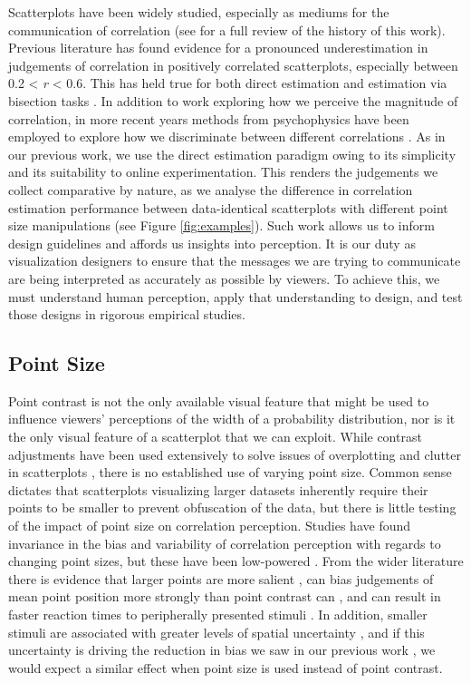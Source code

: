 \documentclass{vgtc}                          %
\begin{document}
Scatterplots have been widely studied, especially as mediums for the communication
of correlation (see \cite{strain_2023} for a full review of the history of this work).
Previous literature has found evidence for a pronounced underestimation in judgements
of correlation in positively correlated scatterplots, especially between 0.2 \textless{} \emph{r} \textless{} 0.6. This
has held true for both direct estimation \cite{meyer_1992, collyer_1990} and estimation
via bisection tasks \cite{rensink_2017}. In addition to work exploring how we
perceive the magnitude of correlation, in more recent years methods from psychophysics
have been employed to explore how we discriminate between different correlations
\cite{rensink_2014, rensink_2017}. As in our previous work,
we use the direct estimation paradigm owing to its simplicity and its suitability
to online experimentation. This renders the judgements we collect
comparative by nature, as we analyse the difference in correlation estimation performance
between data-identical scatterplots with different point size manipulations (see Figure \ref{fig:examples}).
Such work allows us to inform design guidelines and affords us insights into perception.
It is our duty as visualization designers to ensure that the
messages we are trying to communicate are being interpreted as accurately as possible
by viewers. To achieve this, we must understand human perception, apply that understanding
to design, and test those designs in rigorous empirical studies.

\hypertarget{point-size}{%
\subsection{Point Size}\label{point-size}}

Point contrast is not the only available visual feature that might be used
to influence viewers' perceptions of the width of a probability distribution, nor is
it the only visual feature of a scatterplot that we can exploit. While
contrast adjustments have been used extensively to solve issues of overplotting and clutter
in scatterplots \cite{matejka_2015, bertini_2004}, there is no established use of
varying point size. Common sense dictates that scatterplots visualizing larger
datasets inherently require their points to be smaller to prevent obfuscation of the data,
but there is little testing of the impact of point size on correlation perception.
Studies have found invariance in the bias and variability of correlation
perception with regards to changing point sizes, but these have been low-powered
\cite{rensink_2012, rensink_2014}. From the wider literature there is evidence
that larger points are more salient \cite{healey_2012}, can bias judgements of
mean point position more strongly than point contrast can \cite{hong_2021}, and can
result in faster reaction times to peripherally presented stimuli \cite{grice_1983}.
In addition, smaller stimuli are associated with greater levels of spatial uncertainty
\cite{alais_2004}, and if this uncertainty is driving the reduction in bias we saw in our previous work \cite{strain_2023},
we would expect a similar effect when point size is used instead of point contrast.
\end{document}
